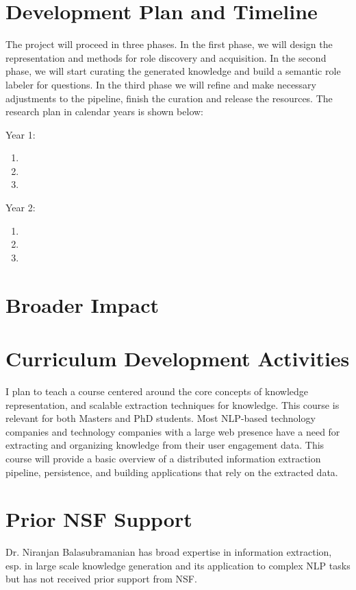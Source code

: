\section{Development Plan and Timeline}

The project will proceed in three phases. In the first phase, we will design the representation and methods for role discovery and acquisition. In the second phase, we will start curating the generated knowledge and build a semantic role labeler for questions. In the third phase we will refine and make necessary adjustments to the pipeline, finish the curation and release the resources. The research plan in calendar years is shown below:


Year 1:  
\begin{enumerate}
\item 
\item 
\item 
\end{enumerate}
Year 2:
\begin{enumerate}
\item 
\item 
\item 
\end{enumerate}


\section{Broader Impact}


\section{Curriculum Development Activities}

I plan to teach a course centered around the core concepts of knowledge representation, and scalable extraction techniques for knowledge. This course is relevant for both Masters and PhD students. Most NLP-based technology companies and technology companies with a large web presence have a need for extracting and organizing knowledge from their user engagement data. This course will provide a basic overview of a distributed information extraction pipeline, persistence, and building applications that rely on the extracted data. 

\section{Prior NSF Support}

Dr. Niranjan Balasubramanian has broad expertise in information extraction, esp. in large scale knowledge generation and its application to complex NLP tasks but has not received prior support from NSF. 
